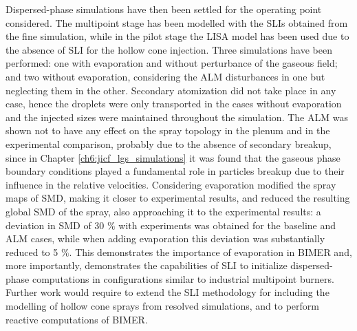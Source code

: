 Dispersed-phase simulations have then been settled for the operating point considered. The multipoint stage has been modelled with the SLIs obtained from the fine simulation, while in the pilot stage the LISA model has been used due to the absence of SLI for the hollow cone injection. Three simulations have been performed: one with evaporation and without perturbance of the gaseous field; and two without evaporation, considering the ALM disturbances in one but neglecting them in the other. Secondary atomization did not take place in any case, hence the droplets were only transported in the cases without evaporation and the injected sizes were maintained throughout the simulation. The ALM was shown not to have any effect on the spray topology in the plenum and in the experimental comparison, probably due to the absence of secondary breakup, since in Chapter \ref{ch6:jicf_lgs_simulations} it was found that the gaseous phase boundary conditions played a fundamental role in particles breakup due to their influence in the relative velocities. Considering evaporation modified the spray maps of SMD, making it closer to experimental results, and reduced the resulting global SMD of the spray, also approaching it to the experimental results: a deviation in SMD of 30 $\%$ with experiments was obtained for the baseline and ALM cases, while when adding evaporation this deviation was substantially reduced to 5 $\%$. This demonstrates the importance of evaporation in BIMER and, more importantly, demonstrates the capabilities of SLI to initialize dispersed-phase computations in configurations similar to industrial multipoint burners. Further work would require to extend the SLI methodology for including the modelling of hollow cone sprays from resolved simulations, and to perform reactive computations of BIMER.




